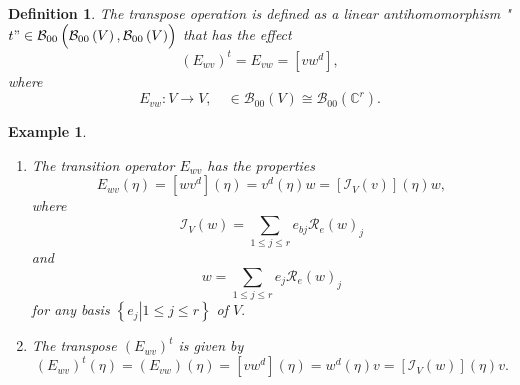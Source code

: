\documentclass[aps,preprint]{revtex4}%
\newtheorem{definition}[theorem]{Definition}
\newtheorem{example}[theorem]{Example}
\begin{document}
\begin{definition}
The transpose operation is \emph{defined} as a linear antihomomorphism
"$t"\in\mathcal{B}_{00}\left(  \overset{}{\mathcal{B}_{00}\left(  V\right)
,\mathcal{B}_{00}\left(  V\right)  }\right)  $ that has the effect
\begin{equation}
\left(  E_{wv}\right)  ^{t}=E_{vw}=\left[  vw^{d}\right]  ,
\end{equation}
where
\begin{equation}
E_{vw}:V\rightarrow V,\quad\in\mathcal{B}_{00}\left(  V\right)  \cong%
\mathcal{B}_{00}\left(  \mathbb{C}^{r}\right)  .
\end{equation}

\end{definition}

\begin{example}
\begin{enumerate}
\item The transition operator $E_{wv}$ has the properties
\begin{equation}
E_{wv}\left(  \eta\right)  =\left[  wv^{d}\right]  \left(  \eta\right)
=v^{d}\left(  \eta\right)  w=\left[  \mathcal{I}_{V}\left(  v\right)  \right]
\left(  \eta\right)  w,
\end{equation}
where
\begin{equation}
\mathcal{I}_{V}\left(  w\right)  =\sum_{1\leq j\leq r}e_{bj}\mathcal{R}%
_{e}\left(  w\right)  _{j}%
\end{equation}
and
\begin{equation}
w=\sum_{1\leq j\leq r}e_{j}\mathcal{R}_{e}\left(  w\right)  _{j}%
\end{equation}
for any basis $\left\{  \left.  e_{j}\right\vert 1\leq j\leq r\right\}  $ of
$V.$

\item The transpose $\left(  E_{wv}\right)  ^{t}$ is given by
\begin{equation}
\left(  E_{wv}\right)  ^{t}\left(  \eta\right)  =\left(  E_{vw}\right)
\left(  \eta\right)  =\left[  vw^{d}\right]  \left(  \eta\right)
=w^{d}\left(  \eta\right)  v=\left[  \mathcal{I}_{V}\left(  w\right)  \right]
\left(  \eta\right)  v.
\end{equation}

\end{enumerate}
\end{example}
\end{document}
